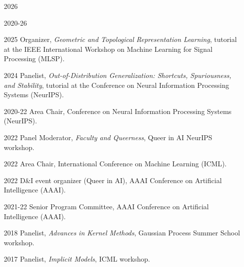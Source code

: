 \documentclass[10pt]{article}
\begin{document}
\begin{itemize}[leftmargin=5em]
  \item[2026] 
  \item[2020-26] 
  \item[2025] Organizer, \emph{Geometric and Topological Representation Learning}, tutorial at the IEEE International Workshop on Machine Learning for Signal Processing (MLSP).
  \item[2024] Panelist, \emph{Out-of-Distribution Generalization: Shortcuts, Spuriousness, and Stability}, tutorial at the Conference on Neural Information Processing Systems (NeurIPS).
  \item[2020-22] Area Chair, Conference on Neural Information Processing Systems (NeurIPS).
  \item[2022] {Panel Moderator, \emph{Faculty and Queerness}, Queer in AI NeurIPS workshop.}
  \item[2022] {Area Chair, International Conference on Machine Learning (ICML).}
  \item[2022] {D\&I event organizer (Queer in AI), AAAI Conference on Artificial Intelligence (AAAI).}
  \item[2021-22] {Senior Program Committee, AAAI Conference on Artificial Intelligence (AAAI).}
  \item[2018] Panelist, \emph{Advances in Kernel Methods}, Gaussian Process Summer School workshop.
  \item[2017] Panelist, \emph{Implicit Models}, ICML workshop.
\end{itemize}







\end{document}
